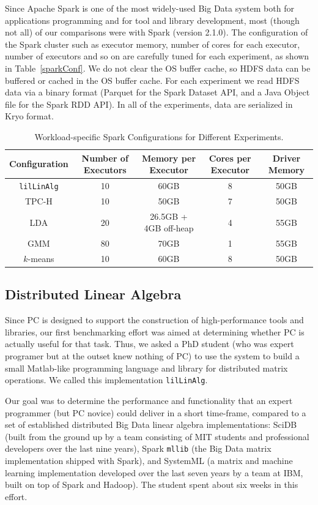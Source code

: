 Since Apache Spark is one of the most widely-used Big Data system both for applications programming and for tool and library
development, most
(though not all) of our comparisons were with Spark (version
2.1.0). The configuration of the Spark cluster such as
executor memory, number of cores for each executor, number of
executors and so on are carefully tuned for each
experiment, as shown in Table~\ref{sparkConf}. We do not clear the OS buffer cache, so HDFS data can be buffered or
cached in the OS buffer cache. For each experiment we read HDFS data
via a binary format (Parquet for the Spark Dataset API,
and a Java Object file for the Spark RDD API).  In all of the
experiments, data are serialized in Kryo format. 

\begin{table}[h!]
\begin{center}
\begin{tabular}{|c||c|c|c|c|}
\hline
Configuration & Number of Executors & Memory per Executor & Cores per Executor& Driver Memory\\
\hline
\texttt{lilLinAlg} &10 & 60GB & 8 & 50GB \\
TPC-H &10 & 50GB & 7 & 50GB \\
LDA &20 & 26.5GB + 4GB off-heap &4 & 55GB\\
GMM&80 & 70GB & 1 & 55GB\\
$k$-means &10 &60GB & 8 & 50GB\\
\hline
\end{tabular}
\caption{Workload-specific Spark Configurations for Different Experiments.}
\label{fig:sparkConf}
\end{center}
\end{table}


\subsection {Distributed Linear Algebra}

Since PC is designed to support the construction
of high-performance tools and libraries, our first benchmarking effort was aimed at determining 
whether PC is actually useful for that task.  Thus, we asked
a PhD student (who was expert programer but at the outset knew nothing of PC) 
to use the system to build a small Matlab-like 
programming language and library for distributed matrix operations.
We called this implementation \texttt{lilLinAlg}.

Our goal was to determine the 
performance and functionality that an expert programmer (but PC novice) could deliver in a short
time-frame, compared to a set of established distributed Big Data linear algebra implementations:
SciDB \cite{brown2010overview, stonebraker2011architecture} (built from the ground up by a team
consisting of MIT students and professional developers over the last
nine years), Spark \texttt{mllib} \cite{meng2016mllib} 
(the Big Data matrix
implementation shipped with Spark), and SystemML \cite{boehm2014hybrid, ghoting2011systemml, boehm2016systemml}
(a matrix and machine learning implementation developed
over the last seven years by a team at IBM, built on top of Spark and Hadoop).
The student spent about six weeks in this effort.

